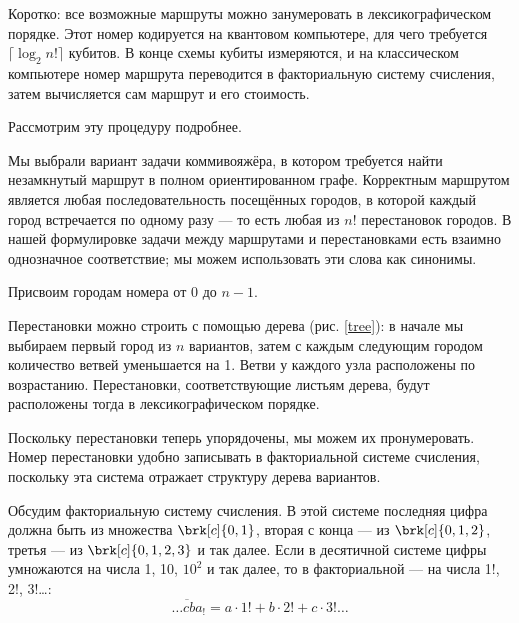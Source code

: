 
Коротко: все возможные маршруты можно занумеровать в лексикографическом порядке. Этот номер кодируется на квантовом компьютере, для чего требуется $\lceil \log_2 n! \rceil$ кубитов. В конце схемы кубиты измеряются, и на классическом компьютере номер маршрута переводится в факториальную систему счисления, затем вычисляется сам маршрут и его стоимость.


Рассмотрим эту процедуру подробнее.




Мы выбрали вариант задачи коммивояжёра, в котором требуется найти незамкнутый маршрут в полном ориентированном графе. Корректным маршрутом является любая последовательность посещённых городов, в которой каждый город встречается по одному разу --- то есть любая из $n!$ перестановок городов. В нашей формулировке задачи между маршрутами и перестановками есть взаимно однозначное соответствие; мы можем использовать эти слова как синонимы.


Присвоим городам номера от 0 до $n-1$.

Перестановки можно строить с помощью дерева (рис. \ref{tree}): в начале мы выбираем первый город из $n$ вариантов, затем с каждым следующим городом количество ветвей уменьшается на 1. Ветви у каждого узла расположены по возрастанию. Перестановки, соответствующие листьям дерева, будут расположены тогда в лексикографическом порядке.


Поскольку перестановки теперь упорядочены, мы можем их пронумеровать. Номер перестановки удобно записывать в факториальной системе счисления, поскольку эта система отражает структуру дерева вариантов. 


Обсудим факториальную систему счисления. В этой системе последняя цифра должна быть из множества $\brk[c]{0, 1}$, вторая с конца --- из $\brk[c]{0, 1, 2}$, третья --- из $\brk[c]{0, 1, 2, 3}$ и так далее. Если в десятичной системе цифры умножаются на числа 1, 10, $10^2$ и так далее, то в факториальной --- на числа 1!, 2!, $3!$\dots:
$$
\overline{\dots cba}_! = a \cdot 1! + b \cdot 2! + c \cdot 3! \dots
$$

